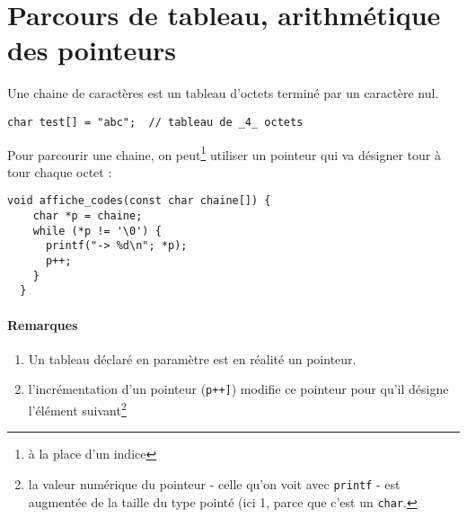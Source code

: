 \section{Parcours de tableau, arithmétique des pointeurs}

Une chaine de caractères est un tableau d'octets terminé par un
caractère nul.

\begin{lstlisting}[style=cextract]
  char test[] = "abc";  // tableau de _4_ octets
\end{lstlisting}

Pour parcourir une chaine, on peut\footnote{à la place d'un indice}
utiliser un pointeur qui va désigner tour à tour chaque octet :

\begin{lstlisting}[style=cextract]
  void affiche_codes(const char chaine[]) {
    char *p = chaine;
    while (*p != '\0') {
      printf("-> %d\n"; *p);
      p++;
    }
  }
\end{lstlisting}
\paragraph{Remarques} \begin{enumerate}
  \item Un tableau déclaré en paramètre est en réalité un pointeur.
  \item l'incrémentation d'un pointeur (\texttt{p++]}) modifie ce
    pointeur pour qu'il désigne l'élément suivant\footnote{la valeur numérique du pointeur - celle qu'on voit avec \texttt{printf} - est augmentée
      de la taille du type pointé (ici 1, parce que c'est un \texttt{char}.
    }
\end{enumerate}

      

